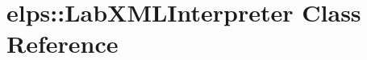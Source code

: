 \hypertarget{classelps_1_1_lab_x_m_l_interpreter}{\section{elps\+:\+:Lab\+X\+M\+L\+Interpreter Class Reference}
\label{classelps_1_1_lab_x_m_l_interpreter}
}
